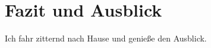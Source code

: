 \chapter[Fazit und Ausblick]{Fazit und Ausblick} 
\label{chap:Fazit}

Ich fahr zitternd nach Hause und genieße den Ausblick.